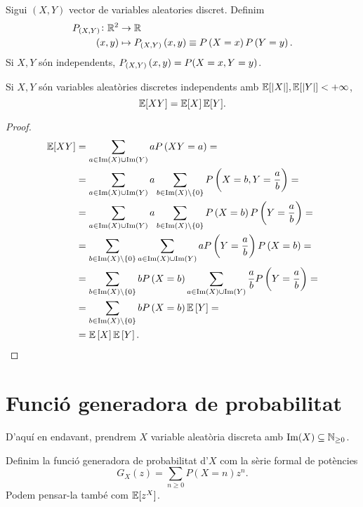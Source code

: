 \begin{defi}
    Sigui $(X,Y)$ vector de variables aleatories discret. Definim
    \begin{align*}
        P_{\left( X,Y\right)}\colon\mathbb{R} ^2&\to\mathbb{R}\\
        \left( x, y\right) &\mapsto P_{\left( X,Y\right)}\left( x, y\right) \equiv P\left( X=x\right) P\left( Y=y\right).
    \end{align*}
    Si $X,Y$ són independents, $P_{\left( X,Y\right)}\left( x, y\right)=P(X=x,Y=y)$.
\end{defi}

\begin{lema}
    Si $X,Y$ són variables aleatòries discretes independents amb $\operatorname{\mathbb{E}}[|X|], \operatorname{\mathbb{E}}[|Y|] < +\infty$,
    \[\operatorname{\mathbb{E}}[XY] = \operatorname{\mathbb{E}}[X]\operatorname{\mathbb{E}}[Y].\]
\end{lema}

\begin{proof}
    \begin{align*}
        \operatorname{\mathbb{E}}[XY] &= \sum_{a\in\operatorname{Im}\left( X\right)\cup\operatorname{Im}\left( Y\right)} aP\left( XY=a\right)=\\
        &=\sum_{a\in\operatorname{Im}\left( X\right)\cup\operatorname{Im}\left( Y\right)} a\sum_{b\in\operatorname{Im}\left( X\right)\setminus\left\{ 0\right\}} P\left( X=b, Y=\frac{a}{b}\right)=\\
        &=\sum_{a\in\operatorname{Im}\left( X\right)\cup\operatorname{Im}\left( Y\right)} a\sum_{b\in\operatorname{Im}\left( X\right)\setminus\left\{ 0\right\}} P\left( X=b\right) P\left( Y=\frac{a}{b}\right)=\\
        &=\sum_{b\in\operatorname{Im}\left( X\right)\setminus\left\{ 0\right\}}\sum_{a\in\operatorname{Im}\left( X\right)\cup\operatorname{Im}\left( Y\right)} a P\left( Y=\frac{a}{b}\right) P\left( X=b\right)=\\
        &=\sum_{b\in\operatorname{Im}\left( X\right)\setminus\left\{ 0\right\}} bP\left( X=b\right)\sum_{a\in\operatorname{Im}\left( X\right)\cup\operatorname{Im}\left( Y\right)} \frac{a}{b} P\left( Y=\frac{a}{b}\right)=\\
        &=\sum_{b\in\operatorname{Im}\left( X\right)\setminus\left\{ 0\right\}} bP\left( X=b\right)\operatorname{\mathbb{E}}\left[ Y\right]=\\
        &=\operatorname{\mathbb{E}}\left[ X\right]\operatorname{\mathbb{E}}\left[ Y\right].
    \end{align*}
\end{proof}


\section{Funció generadora de probabilitat}
D'aquí en endavant, prendrem $X$ variable aleatòria discreta amb $\operatorname{Im}(X) \subseteq \mathbb{N}_{\geq 0}$.
\begin{defi}
    Definim la funció generadora de probabilitat d'$X$ com la sèrie formal de potències
    \[G_X(z) = \sum_{n \geq 0} P(X = n) z^n.\]
    Podem pensar-la també com $\operatorname{\mathbb{E}}[z^X]$.
\end{defi}

